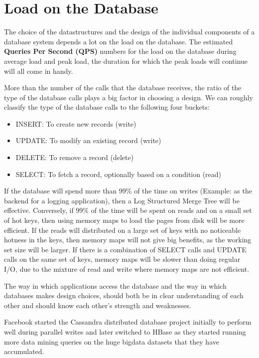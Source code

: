 \section{}
\section{Load on the Database}

The choice of the datastructures and the design of the individual components of a database system depends a lot on the load on the database. The estimated \textbf{Queries Per Second (QPS)} numbers for the load on the database during average load and peak load, the duration for which the peak loads will continue will all come in handy.

More than the number of the calls that the database receives, the ratio of the type of the database calls plays a big factor in choosing a design. We can roughly classify the type of the database calls to the following four buckets:
\begin{itemize}
\item INSERT: To create new records (write)
\item UPDATE: To modify an existing record (write)
\item DELETE: To remove a record (delete)
\item SELECT: To fetch a record, optionally based on a condition (read)
\end{itemize}

If the database will spend more than 99\% of the time on writes (Example: as the backend for a logging application), then a Log Structured Merge Tree \cite{O_Neil_1996} will be effective. Conversely, if 99\% of the time will be spent on reads and on a small set of hot keys, then using memory maps to load the pages from disk will be more efficient. If the reads will distributed on a large set of keys with no noticeable hotness in the keys, then memory maps will not give big benefits, as the working set size will be larger. If there is a combination of SELECT calls and UPDATE calls on the same set of keys, memory maps will be slower than doing regular I/O, due to the mixture of read and write where memory maps are not efficient.

The way in which applications access the database and the way in which databases makes design choices, should both be in clear understanding of each other and should know each other's strength and weaknesses.

Facebook started the Cassandra\cite{Lakshman_2009} distributed database project initially to perform well during parallel writes and later switched to HBase as they started running more data mining queries on the huge bigdata datasets that they have accumulated.